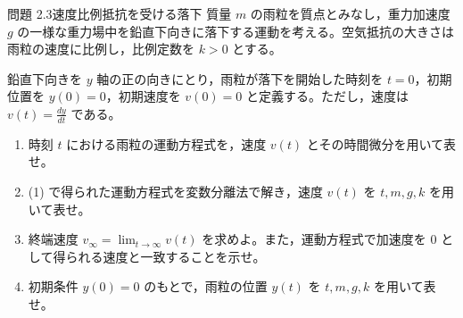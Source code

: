 \problemstart
{}

\begin{problemBox}{問題 2.3\quad 速度比例抵抗を受ける落下\hspace{1.2em}{\small\mdseries 〔標準〕}}
質量 $m$ の雨粒を質点とみなし，重力加速度 $g$ の一様な重力場中を鉛直下向きに落下する運動を考える。空気抵抗の大きさは雨粒の速度に比例し，比例定数を $k>0$ とする。
\par
鉛直下向きを $y$ 軸の正の向きにとり，雨粒が落下を開始した時刻を $t = 0$，初期位置を $y(0) = 0$，初期速度を $v(0) = 0$ と定義する。ただし，速度は $v(t) = \frac{dy}{dt}$ である。

\begin{enumerate}
  \item 時刻 $t$ における雨粒の運動方程式を，速度 $v(t)$ とその時間微分を用いて表せ。

  \item (1) で得られた運動方程式を変数分離法で解き，速度 $v(t)$ を $t, m, g, k$ を用いて表せ。

  \item 終端速度 $v_{\infty} = \lim_{t \to \infty} v(t)$ を求めよ。また，運動方程式で加速度を 0 として得られる速度と一致することを示せ。

  \item 初期条件 $y(0) = 0$ のもとで，雨粒の位置 $y(t)$ を $t, m, g, k$ を用いて表せ。
\end{enumerate}
\end{problemBox}

